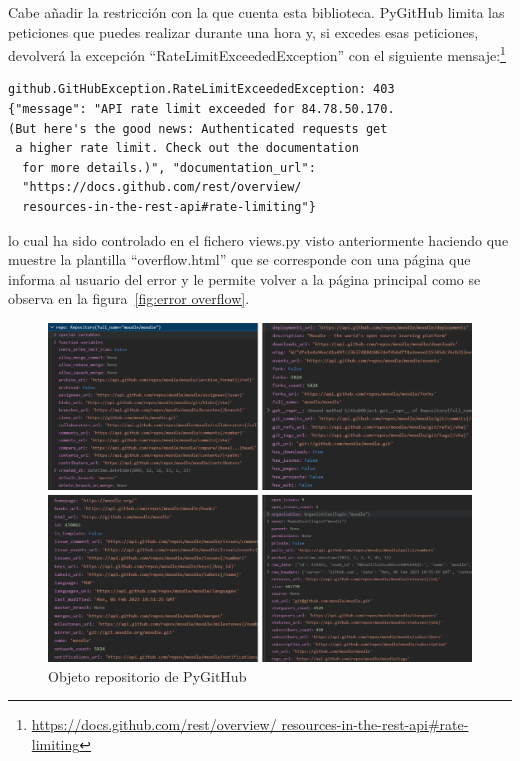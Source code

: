 \documentclass[a4paper, 12pt]{book}
\begin{document}
Cabe añadir la restricción con la que cuenta esta biblioteca. PyGitHub limita las peticiones que puedes realizar durante una hora y, si excedes esas peticiones, devolverá la excepción ``RateLimitExceededException'' con el siguiente mensaje:\footnote{\url{https://docs.github.com/rest/overview/
  resources-in-the-rest-api#rate-limiting}} \begin{verbatim}
github.GitHubException.RateLimitExceededException: 403 
{"message": "API rate limit exceeded for 84.78.50.170. 
(But here's the good news: Authenticated requests get
 a higher rate limit. Check out the documentation
  for more details.)", "documentation_url": 
  "https://docs.github.com/rest/overview/
  resources-in-the-rest-api#rate-limiting"} 
\end{verbatim} lo cual ha sido controlado en el fichero views.py visto anteriormente haciendo que muestre la plantilla ``overflow.html'' que se corresponde con una página que informa al usuario del error y le permite volver a la página principal como se observa en la figura~\ref{fig:error overflow}.

\begin{figure}
    \centering
    \includegraphics[bb=0 0 800 600, width=12cm, keepaspectratio]{img/objeto_repositorio.png}
    \caption{Objeto repositorio de PyGitHub}\label{fig:Objeto repositorio de PyGitHub}
\end{figure}
\end{document}
